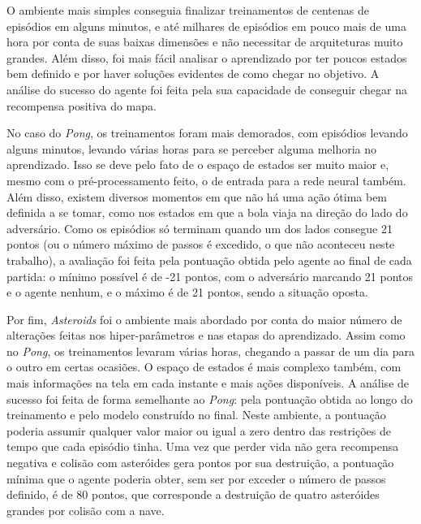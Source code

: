 O ambiente mais simples conseguia finalizar treinamentos de centenas de episódios em alguns minutos, e até milhares de episódios em pouco mais de uma hora por conta de suas baixas dimensões e não necessitar de arquiteturas muito grandes.
Além disso, foi mais fácil analisar o aprendizado por ter poucos estados bem definido e por haver soluções evidentes de como chegar no objetivo.
A análise do sucesso do agente foi feita pela sua capacidade de conseguir chegar na recompensa positiva do mapa.

No caso do \textit{Pong}, os treinamentos foram mais demorados, com episódios levando alguns minutos, levando várias horas para se perceber alguma melhoria no aprendizado.
Isso se deve pelo fato de o espaço de estados ser muito maior e, mesmo com o pré-processamento feito, o de entrada para a rede neural também.
Além disso, existem diversos momentos em que não há uma ação ótima bem definida a se tomar, como nos estados em que a bola viaja na direção do lado do adversário.
Como os episódios só terminam quando um dos lados consegue 21 pontos (ou o número máximo de passos é excedido, o que não aconteceu neste trabalho), a avaliação foi feita pela pontuação obtida pelo agente ao final de cada partida:
o mínimo possível é de -21 pontos, com o adversário marcando 21 pontos e o agente nenhum, e o máximo é de 21 pontos, sendo a situação oposta.

Por fim, \textit{Asteroids} foi o ambiente mais abordado por conta do maior número de alterações feitas nos hiper-parâmetros e nas etapas do aprendizado.
Assim como no \textit{Pong}, os treinamentos levaram várias horas, chegando a passar de um dia para o outro em certas ocasiões.
O espaço de estados é mais complexo também, com mais informações na tela em cada instante e mais ações disponíveis.
A análise de sucesso foi feita de forma semelhante ao \textit{Pong}: pela pontuação obtida ao longo do treinamento e pelo modelo construído no final.
Neste ambiente, a pontuação poderia assumir qualquer valor maior ou igual a zero dentro das restrições de tempo que cada episódio tinha.
Uma vez que perder vida não gera recompensa negativa e colisão com asteróides gera pontos por sua destruição, a pontuação mínima que o agente poderia obter, sem ser por exceder o número de passos definido, é de 80 pontos, que corresponde a destruição de quatro asteróides grandes por colisão com a nave.


